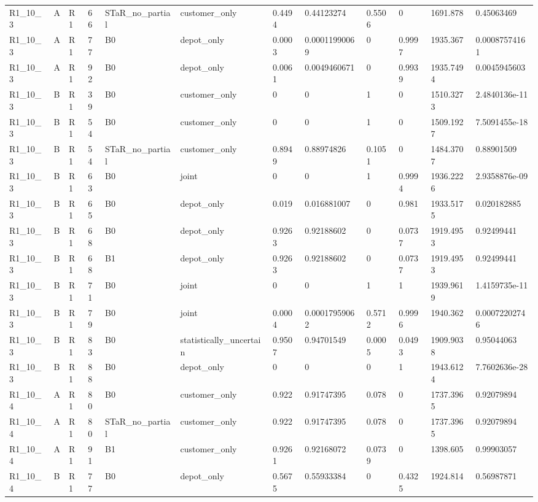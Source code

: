 \begin{longtable}{llllllllllll}
R1\_10\_3 & A & R1 & 66 & STaR\_no\_partial & customer\_only & 0.4494 & 0.44123274 & 0.5506 & 0 & 1691.878 & 0.45063469 \\
R1\_10\_3 & A & R1 & 77 & B0 & depot\_only & 0.0003 & 0.00011990069 & 0 & 0.9997 & 1935.367 & 0.00087574161 \\
R1\_10\_3 & A & R1 & 92 & B0 & depot\_only & 0.0061 & 0.0049460671 & 0 & 0.9939 & 1935.7494 & 0.0045945603 \\
R1\_10\_3 & B & R1 & 39 & B0 & customer\_only & 0 & 0 & 1 & 0 & 1510.3273 & 2.4840136e-11 \\
R1\_10\_3 & B & R1 & 54 & B0 & customer\_only & 0 & 0 & 1 & 0 & 1509.1927 & 7.5091455e-18 \\
R1\_10\_3 & B & R1 & 54 & STaR\_no\_partial & customer\_only & 0.8949 & 0.88974826 & 0.1051 & 0 & 1484.3707 & 0.88901509 \\
R1\_10\_3 & B & R1 & 63 & B0 & joint & 0 & 0 & 1 & 0.9994 & 1936.2226 & 2.9358876e-09 \\
R1\_10\_3 & B & R1 & 65 & B0 & depot\_only & 0.019 & 0.016881007 & 0 & 0.981 & 1933.5175 & 0.020182885 \\
R1\_10\_3 & B & R1 & 68 & B0 & depot\_only & 0.9263 & 0.92188602 & 0 & 0.0737 & 1919.4953 & 0.92499441 \\
R1\_10\_3 & B & R1 & 68 & B1 & depot\_only & 0.9263 & 0.92188602 & 0 & 0.0737 & 1919.4953 & 0.92499441 \\
R1\_10\_3 & B & R1 & 71 & B0 & joint & 0 & 0 & 1 & 1 & 1939.9619 & 1.4159735e-11 \\
R1\_10\_3 & B & R1 & 79 & B0 & joint & 0.0004 & 0.00017959062 & 0.5712 & 0.9996 & 1940.362 & 0.00072202746 \\
R1\_10\_3 & B & R1 & 83 & B0 & statistically\_uncertain & 0.9507 & 0.94701549 & 0.0005 & 0.0493 & 1909.9038 & 0.95044063 \\
R1\_10\_3 & B & R1 & 88 & B0 & depot\_only & 0 & 0 & 0 & 1 & 1943.6124 & 7.7602636e-28 \\
R1\_10\_4 & A & R1 & 80 & B0 & customer\_only & 0.922 & 0.91747395 & 0.078 & 0 & 1737.3965 & 0.92079894 \\
R1\_10\_4 & A & R1 & 80 & STaR\_no\_partial & customer\_only & 0.922 & 0.91747395 & 0.078 & 0 & 1737.3965 & 0.92079894 \\
R1\_10\_4 & A & R1 & 91 & B1 & customer\_only & 0.9261 & 0.92168072 & 0.0739 & 0 & 1398.605 & 0.99903057 \\
R1\_10\_4 & B & R1 & 77 & B0 & depot\_only & 0.5675 & 0.55933384 & 0 & 0.4325 & 1924.814 & 0.56987871 \\

\end{longtable}
